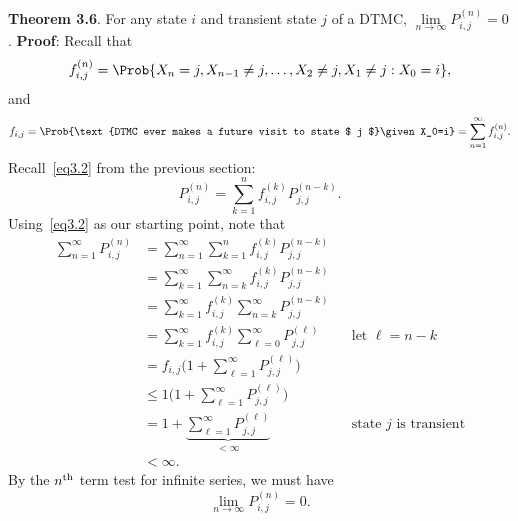 \begin{Result}
    \textbf{Theorem 3.6}. For any state $i$ and transient state $j$ of a DTMC,
    $ \lim\limits_{{n} \to {\infty}} P_{i,j}^{(n)}=0 $.
    \tcblower{}
    \textbf{Proof}: Recall that
    \[ f_{i,j}^{(n)}=\Prob{X_n=j,X_{n-1}\ne j,\ldots,X_2\ne j, X_1\ne j\given X_0=i}, \]
    and
    \[ f_{i,j}=\Prob{\text{DTMC ever makes a future visit to state $ j $}\given X_0=i}=\sum_{n=1}^{\infty} f_{i,j}^{(n)}. \]
    Recall~\ref{eq3.2} from the previous section:
    \[ P_{i,j}^{(n)}=\sum_{k=1}^{n} f_{i,j}^{(k)}P_{j,j}^{(n-k)}. \]
    Using~\ref{eq3.2} as our starting point, note that
    \begin{align*}
        \sum_{n=1}^{\infty} P_{i,j}^{(n)}
         & =\sum_{n=1}^{\infty} \sum_{k=1}^{n} f_{i,j}^{(k)}P_{j,j}^{(n-k)}                                             \\
         & =\sum_{k=1}^{\infty} \sum_{n=k}^{\infty} f_{i,j}^{(k)}P_{j,j}^{(n-k)}                                        \\
         & =\sum_{k=1}^{\infty} f_{i,j}^{(k)}\sum_{n=k}^{\infty} P_{j,j}^{(n-k)}                                        \\
         & =\sum_{k=1}^{\infty} f_{i,j}^{(k)}\sum_{\ell=0}^{\infty} P_{j,j}^{(\ell)} &  & \text{let }\ell=n-k           \\
         & =f_{i,j}\biggl(1+\sum_{\ell=1}^{\infty} P_{j,j}^{(\ell)}\biggr)                                              \\
         & \le 1\biggl(1+\sum_{\ell=1}^{\infty} P_{j,j}^{(\ell)}\biggr)                                                 \\
         & =1+\underbrace{\sum_{\ell=1}^{\infty} P_{j,j}^{(\ell)}}_{<\infty}         &  & \text{state $j$ is transient} \\
         & <\infty.
    \end{align*}
    By the $ n\textsuperscript{th} $ term test for infinite series,
    we must have
    \[ \lim\limits_{{n} \to {\infty}} P_{i,j}^{(n)}=0. \]
\end{Result}
